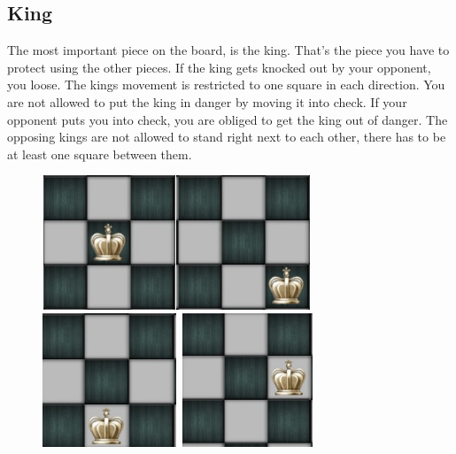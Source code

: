 \documentclass{article}
\begin{document}
\subsection*{King} The most important piece on the board, is the king. That’s the piece you have to protect using the other pieces. If the king gets knocked out by your opponent, you loose. The kings movement is restricted to one square in each direction. You are not allowed to put the king in danger by moving it into check. If your opponent puts you into check, you are obliged to get the king out of danger. The opposing kings are not allowed to stand right next to each other, there has to be at least one square between them. 
\begin{figure}[h]
\includegraphics[width=4cm, height=4cm]{king1}\includegraphics[width=4cm, height=4cm]{king2} \includegraphics[width=4cm, height=4cm]{king3} \includegraphics[width=4cm, height=4cm]{king4}
\end{figure}
\end{document}
